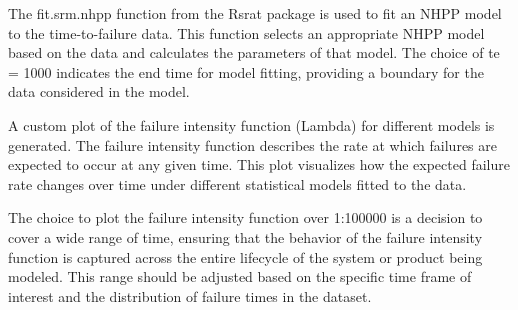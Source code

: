 \documentclass[12pt]{article}
\numberwithin{table}{section}
\begin{document}
The fit.srm.nhpp function from the Rsrat package is used to fit an NHPP model to the time-to-failure data. This function selects an appropriate NHPP model based on the data and calculates the parameters of that model. The choice of te = 1000 indicates the end time for model fitting, providing a boundary for the data considered in the model.

A custom plot of the failure intensity function (Lambda) for different models is generated. The failure intensity function describes the rate at which failures are expected to occur at any given time. This plot visualizes how the expected failure rate changes over time under different statistical models fitted to the data.

The choice to plot the failure intensity function over 1:100000 is a decision to cover a wide range of time, ensuring that the behavior of the failure intensity function is captured across the entire lifecycle of the system or product being modeled. This range should be adjusted based on the specific time frame of interest and the distribution of failure times in the dataset.
\end{document}
